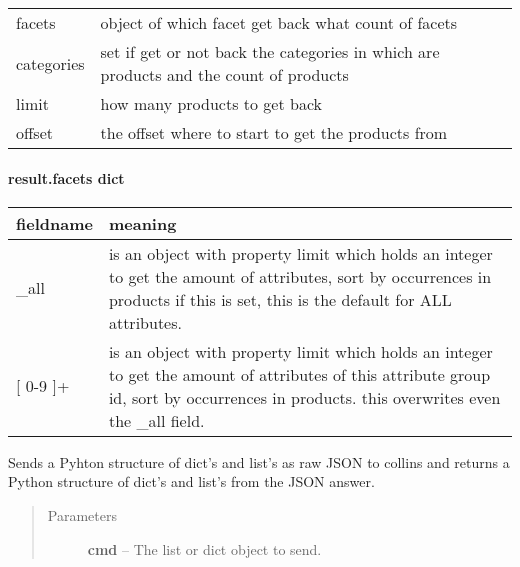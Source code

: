 \documentclass[letterpaper,10pt,english]{sphinxmanual}
\begin{document}
\begin{fulllineitems}
\begin{fulllineitems}
\begin{tabulary}{\linewidth}{|L|L|}
facets
 & 
object of which facet get back what count of facets
\\

categories
 & 
set if get or not back the categories in which are products
and the count of products
\\

limit
 & 
how many products to get back
\\

offset
 & 
the offset where to start to get the products from
\\
\hline\end{tabulary}

\paragraph{result.facets dict}

\begin{tabulary}{\linewidth}{|L|L|}
\hline
\textsf{\relax 
fieldname
} & \textsf{\relax 
meaning
}\\
\hline
\_all
 & 
is an object with property limit which holds an integer to
get the amount of attributes, sort by occurrences in products
if this is set, this is the default for ALL attributes.
\\

{[} 0-9 {]}+
 & 
is an object with property limit which holds an integer to
get the amount of attributes of this attribute group id,
sort by occurrences in products. this overwrites even the
\_all field.
\\
\hline\end{tabulary}


\end{fulllineitems}


\begin{fulllineitems}
\label{collins:collins.Collins.send}
Sends a Pyhton structure of dict's and list's as raw JSON to collins and 
returns a Python structure of dict's and list's from the JSON answer.
\begin{quote}\begin{description}
\item[{Parameters}] \leavevmode
\textbf{cmd} -- The list or dict object to send.

\end{description}\end{quote}

\end{fulllineitems}


\end{fulllineitems}
\end{document}

